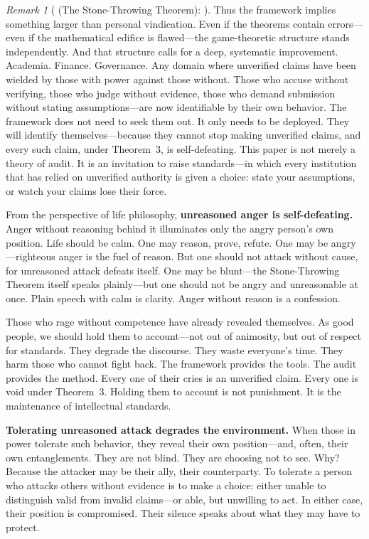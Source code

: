 \documentclass[12pt,a4paper]{article}
\theoremstyle{definition}
\theoremstyle{remark}
\newtheorem{remark}{Remark}[section]
\begin{document}
\begin{remark}[ (The Stone-Throwing Theorem): ]
Thus the framework implies something larger than personal vindication. Even if the theorems contain errors—even if the mathematical edifice is flawed—the game-theoretic structure stands independently. And that structure calls for a deep, systematic improvement. Academia. Finance. Governance. Any domain where unverified claims have been wielded by those with power against those without. Those who accuse without verifying, those who judge without evidence, those who demand submission without stating assumptions—are now identifiable by their own behavior. The framework does not need to seek them out. It only needs to be deployed. They will identify themselves—because they cannot stop making unverified claims, and every such claim, under Theorem~3, is self-defeating. This paper is not merely a theory of audit. It is an invitation to raise standards—in which every institution that has relied on unverified authority is given a choice: state your assumptions, or watch your claims lose their force.

From the perspective of life philosophy, \textbf{unreasoned anger is self-defeating.} Anger without reasoning behind it illuminates only the angry person's own position. Life should be calm. One may reason, prove, refute. One may be angry—righteous anger is the fuel of reason. But one should not attack without cause, for unreasoned attack defeats itself. One may be blunt—the Stone-Throwing Theorem itself speaks plainly—but one should not be angry and unreasonable at once. Plain speech with calm is clarity. Anger without reason is a confession.

Those who rage without competence have already revealed themselves. As good people, we should hold them to account—not out of animosity, but out of respect for standards. They degrade the discourse. They waste everyone's time. They harm those who cannot fight back. The framework provides the tools. The audit provides the method. Every one of their cries is an unverified claim. Every one is void under Theorem~3. Holding them to account is not punishment. It is the maintenance of intellectual standards.

\textbf{Tolerating unreasoned attack degrades the environment.} When those in power tolerate such behavior, they reveal their own position—and, often, their own entanglements. They are not blind. They are choosing not to see. Why? Because the attacker may be their ally, their counterparty. To tolerate a person who attacks others without evidence is to make a choice: either unable to distinguish valid from invalid claims—or able, but unwilling to act. In either case, their position is compromised. Their silence speaks about what they may have to protect.


\end{remark}
\end{document}
